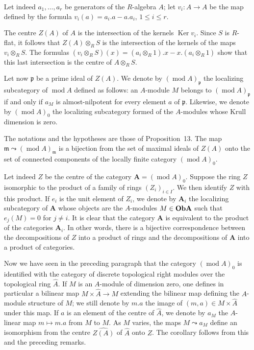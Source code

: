 Let indeed $a_1,\ldots,a_r$ be generators of the $R$-algebra $A$; let
$v_i:A\to A$ be the map defined by the formula
$v_i(a)=a_i.a-a.a_i$, $1\le i\le r$.

The centre $Z(A)$ of $A$ is the intersection of the kernels
$\operatorname{Ker}v_i$. Since $S$ is $R$-flat, it follows that
$Z(A)\otimes_RS$ is the intersection of the kernels of the maps
$v_i\otimes_RS$. The formulas
$(v_i\otimes_RS)(x)=(a_i\otimes_R1).x-x.(a_i\otimes_R1)$ show that this
last intersection is the centre of $A\otimes_RS$.

Let now $\mathfrak{p}$ be a prime ideal of $Z(A)$. We denote by
$(\operatorname{mod}A)_{\mathfrak{p}}$ the localizing subcategory of
$\operatorname{mod}A$ defined as follows: an $A$-module $M$ belongs to
$(\operatorname{mod}A)_{\mathfrak{p}}$ if and only if $a_M$ is
almost-nilpotent for every element $a$ of $\mathfrak{p}$. Likewise, we
denote by $(\operatorname{mod}A)_0$ the localizing subcategory formed
of the $A$-modules whose Krull dimension is zero.

\begin{corollary}
The notations and the hypotheses are those of Proposition~13. The map
$\mathfrak{m}\leadsto(\operatorname{mod}A)_{\mathfrak{m}}$ is a
bijection from the set of maximal ideals of $Z(A)$ onto the set of
connected components of the locally finite category
$(\operatorname{mod}A)_0$.
\end{corollary}

Let indeed $Z$ be the centre of the category
$\mathbf{A}=(\operatorname{mod}A)_0$. Suppose the ring $Z$ isomorphic
to the product of a family of rings $(Z_i)_{i\in I}$. We then identify
$Z$ with this product. If $e_i$ is the unit element of $Z_i$, we
denote by $\mathbf{A}_i$ the localizing subcategory of $\mathbf{A}$
whose objects are the $A$-modules $M\in\mathbf{Ob}\mathbf{A}$ such that
$e_j(M)=0$ for $j\ne i$. It is clear that the category $\mathbf{A}$ is
equivalent to the product of the categories $\mathbf{A}_i$. In other
words, there is a bijective correspondence between the decompositions
of $Z$ into a product of rings and the decompositions of $\mathbf{A}$
into a product of categories.

Now we have seen in the preceding paragraph that the category
$(\operatorname{mod}A)_0$ is identified with the category of discrete
topological right modules over the topological ring $\hat A$. If $M$
is an $A$-module of dimension zero, one defines in particular a
bilinear map $M\times\hat A\to M$ extending the bilinear map defining
the $A$-module structure of $M$; we still denote by $m.a$ the image of
$(m,a)\in M\times\hat A$ under this map. If $a$ is an element of the
centre of $\hat A$, we denote by $a_M$ the $A$-linear map
$m\mapsto m.a$ from $M$ to $M$. As $M$ varies, the maps
$M\leadsto a_M$ define an isomorphism from the centre
$\widehat{Z(A)}$ of $\hat A$ onto $Z$. The corollary follows from this
and the preceding remarks.

